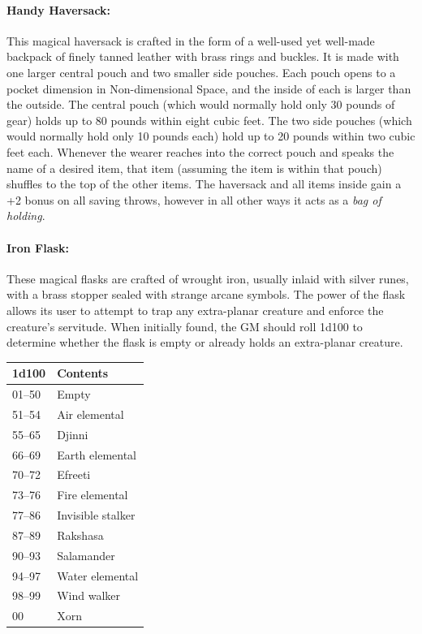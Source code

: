 \begin{multicols}{2}
\paragraph{Handy Haversack:} This magical haversack is crafted in the form of a well-used yet well-made backpack of finely tanned leather with brass rings and buckles.  It is made with one larger central pouch and two smaller side pouches.  Each pouch opens to a pocket dimension in Non-dimensional Space, and the inside of each is larger than the outside.  The central pouch (which would normally hold only 30 pounds of gear) holds up to 80 pounds within eight cubic feet.  The two side pouches (which would normally hold only 10 pounds each) hold up to 20 pounds within two cubic feet each.  Whenever the wearer reaches into the correct pouch and speaks the name of a desired item, that item (assuming the item is within that pouch) shuffles to the top of the other items.  The haversack and all items inside gain a  +2 bonus on all saving throws, however in all other ways it acts as a \textit{bag of holding}.

\paragraph{Iron Flask:} These magical flasks are crafted of wrought iron, usually inlaid with silver runes, with a brass stopper sealed with strange arcane symbols.  The power of the flask allows its user to attempt to trap any extra-planar creature and enforce the creature's servitude.  When initially found, the GM should roll 1d100 to determine whether the flask is empty or already holds an extra-planar creature.
 
\noindent \begin{tabular}{|p{}|p{}|}
\hline
1d100	& Contents \\
\hline\hline
\rowcolor[gray]{0.9}01--50	& Empty \\
51--54	& Air elemental \\
\rowcolor[gray]{0.9}55--65	& Djinni \\
66--69	& Earth elemental \\
\rowcolor[gray]{0.9}70--72	& Efreeti \\
73--76	& Fire elemental \\
\rowcolor[gray]{0.9}77--86	& Invisible stalker \\
87--89	& Rakshasa \\
\rowcolor[gray]{0.9}90--93	& Salamander \\
94--97	& Water elemental \\
\rowcolor[gray]{0.9}98--99	& Wind walker \\
00	& Xorn \\
\hline
\end{tabular}


\end{multicols}
